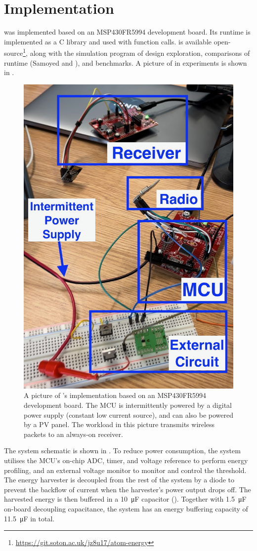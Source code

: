 \section{Implementation} \label{sec:implementation}

\nn{} was implemented based on an MSP430FR5994 development board.
Its runtime is implemented as a C library and used with function calls. 
\nn{} is available open-source\footnote{\url{https://git.soton.ac.uk/jz8u17/atom-energy}}, along with the simulation program of design exploration, comparisons of runtime (Samoyed and \debs{}), and benchmarks.
A picture of \nn{} in experiments is shown in .

\begin{figure}[!t]
    \centering
    \includegraphics[width=0.65\columnwidth]{ch5_optic/figures/experiment.png}
    \caption{A picture of \nn{}'s implementation based on an MSP430FR5994 development board. The MCU is intermittently powered by a digital power supply (constant low current source), and can also be powered by a PV panel. The workload in this picture transmits wireless packets to an always-on receiver. }
    \label{fig:experiment_photo}
\end{figure}

The system schematic is shown in .
To reduce power consumption, the system utilises the MCU's on-chip ADC, timer, and voltage reference to perform energy profiling, and an external voltage monitor to monitor and control the threshold. 
The energy harvester is decoupled from the rest of the system by a diode to prevent the backflow of current when the harvester's power output drops off.
The harvested energy is then buffered in a \SI{10}{\micro\farad} capacitor (). 
Together with \SI{1.5}{\micro\farad} on-board decoupling capacitance, the system has an energy buffering capacity of \SI{11.5}{\micro\farad} in total. 

